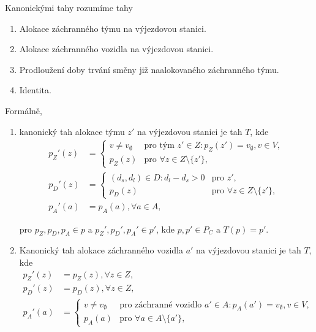 \begin{definice}
  Kanonickými tahy rozumíme tahy
  \begin{enumerate}
    \item
      Alokace záchranného týmu na výjezdovou stanici.

    \item
      Alokace záchranného vozidla na výjezdovou stanici.

    \item
      Prodloužení doby trvání směny již naalokovaného záchranného týmu. 

    \item
      Identita.
  \end{enumerate}

  Formálně,
  \begin{enumerate}
    \item
      kanonický tah alokace týmu $z'$ na výjezdovou stanici je tah $T$, kde
      \begin{align*}
        p_Z'(z) &=
          \begin{cases}
            v \neq v_{\emptyset} & \text{pro tým $z' \in Z \colon p_Z(z') = v_{\emptyset}, v \in V$}, \\
            p_Z(z) & \text{pro $\forall z \in Z \setminus \{ z' \}$},
          \end{cases}
          \\
        p_D'(z) &=
          \begin{cases}
            (d_s, d_l) \in D \colon d_l - d_s > 0 & \text{pro $z'$}, \\
            p_D(z) & \text{pro $\forall z \in Z \setminus \{ z' \}$},
          \end{cases}
          \\
        p_A'(a) &= p_A(a), \forall a \in A,
      \end{align*}

      pro $p_Z, p_D, p_A \in p$ a $p_Z', p_D', p_A' \in p'$, kde $p, p' \in P_C$ a $T(p) = p'$.

    \item
      Kanonický tah alokace záchranného vozidla $a'$ na výjezdovou stanici je tah $T$, kde
      \begin{align*}
        p_Z'(z) &= p_Z(z), \forall z \in Z,
        \\
        p_D'(z) &= p_D(z), \forall z \in Z,
        \\
        p_A'(a) &=
        \begin{cases}
          v \neq v_{\emptyset} & \text{pro záchranné vozidlo $a' \in A \colon p_A(a') = v_{\emptyset}, v \in V$}, \\
          p_A(a) & \text{pro $\forall a \in A \setminus \{ a' \}$},
        \end{cases}
      \end{align*}


\end{enumerate}
\end{definice}
